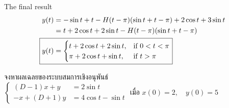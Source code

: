 \documentclass[12pt,final]{novelette} %
\begin{document}
\begin{question}[resume]
    The final result
    \begin{align*}
        y(t)          & = - \sin t + t - H(t - \pi)(\sin t + t - \pi) + 2 \cos t + 3 \sin t \\
                      & = t + 2 \cos t + 2 \sin t - H(t - \pi)(\sin t + t - \pi)            \\
        \Aboxed{ y(t) & =
        {
        \begin{cases}
            t + 2 \cos t + 2 \sin t, & \text{if}\ 0 < t < \pi \\
            \pi + 2 \cos t + \sin t, & \text{if}\ t > \pi
        \end{cases}
        }
        }
    \end{align*}

    \item {}
    จงหาผลเฉลยของระบบสมการเชิงอนุพันธ์\\[.5em]
    \hspace*{.5cm}$
        \left\{\begin{aligned}
            (D-1)x + y  & = 2 \sin t         \\[.2em]
            -x + (D+1)y & = 4\cos t - \sin t
        \end{aligned}\right.
    $ \quad เมื่อ $x(0) = 2, \quad y(0) = 5$ 


\end{question}
\end{document}
